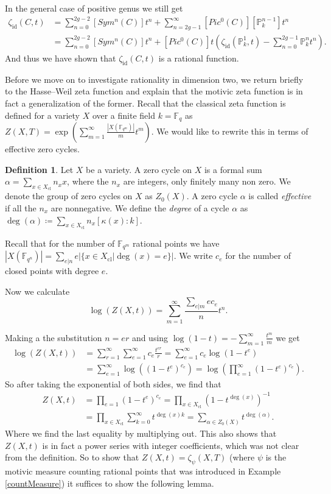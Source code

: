 \documentclass[11pt, a4paper, german, twoside]{article}
\theoremstyle{plain}
\theoremstyle{definition}
\newtheorem{definition}[theorem]{Definition}
\begin{document}
In the general case of positive genus we still get
\begin{align*}
    \zeta_{\mathrm{id}}(C,t) &= \sum_{n=0}^{2g-2} [Sym^n(C)]t^n + \sum_{n=2g-1}^\infty [Pic^0(C)][\mathbb{P}_k^{n-1}]t^n\\
    &= \sum_{n=0}^{2g-2} [Sym^n(C)]t^n + [Pic^0(C)]t(\zeta_{\mathrm{id}}(\mathbb{P}_k^1, t) - \sum_{n=0}^{2g-1} \mathbb{P}_k^nt^n).
\end{align*}
And thus we have shown that $\zeta_{\mathrm{id}}(C,t)$ is a rational function.

Before we move on to investigate rationality in dimension two, we return briefly to the Hasse--Weil zeta function and explain that the 
motivic zeta function is in fact a generalization of the former.
Recall that the classical zeta function is defined for a variety $X$ over a finite field $k = \mathbb{F}_q$ as 
$Z(X,T) = \exp\left(\sum_{m=1}^\infty \frac{|X(\mathbb{F}_{q^m})|}{m}t^m\right)$. We would like to rewrite this in terms of effective zero cycles.
\begin{definition}
    Let $X$ be a variety. A zero cycle on $X$ is a formal sum $\alpha = \sum_{x \in X_\mathrm{cl}} n_x x$, where the $n_x$ are integers,
    only finitely many non zero. We denote the group of zero cycles on $X$ as $Z_0(X)$. A zero cycle $\alpha$ is called
    \emph{effective} if all the $n_x$ are nonnegative. We define the \emph{degree} of a cycle $\alpha$ as 
    $\deg(\alpha) \coloneqq \sum_{x \in X_{\mathrm{cl}}} n_x [\kappa(x):k]$.
\end{definition}

Recall that for the number of $\mathbb{F}_{q^m}$ rational points we have
$|X(\mathbb{F}_{q^n})| = \sum_{e | n} e|\{x \in X_{\mathrm{cl}} | \deg(x) = e\}|$. We write $c_e$ for the number of closed points with degree $e$.

Now we calculate
\[
\log(Z(X,t)) = \sum_{m=1}^\infty \frac{\sum_{e | m} ec_e}{n} t^n.
\]

Making a the substitution $n = er$ and using $\log(1-t) = - \sum_{m=1}^\infty \frac{t^m}{m}$ we get 
\begin{align*}
    \log(Z(X,t)) &= \sum_{r=1}^\infty \sum_{e=1}^\infty c_e \frac{t^{er}}{r} = \sum_{e=1}^\infty c_e \log(1-t^e) \\
                 &= \sum_{e=1}^\infty \log ( (1-t^e)^{c_e} ) = \log(\prod_{e=1}^\infty (1-t^e)^{c_e}).
\end{align*}
So after taking the exponential of both sides, we find that
\begin{align*}
    Z(X,t) &= \prod_{e=1} (1-t^e)^{c_e} = \prod_{x \in X_{\mathrm{cl}}} (1-t^{\deg(x)})^{-1}\\
           &= \prod_{x \in X_{\mathrm{cl}}} \sum_{k=0}^\infty t^{\deg(x)k} = \sum_{\alpha \in Z_0(X)} t^{\deg(\alpha)}.
\end{align*}
Where we find the last equality by multiplying out. This also shows that $Z(X,t)$ is in fact a power series with integer coefficients, which
was not clear from the definition.
So to show that $Z(X,t) = \zeta_{\psi}(X,T)$ 
(where $\psi$ is the motivic measure counting rational points that was introduced in Example \ref{countMeasure}) 
it suffices to show the following lemma.
\end{document}

